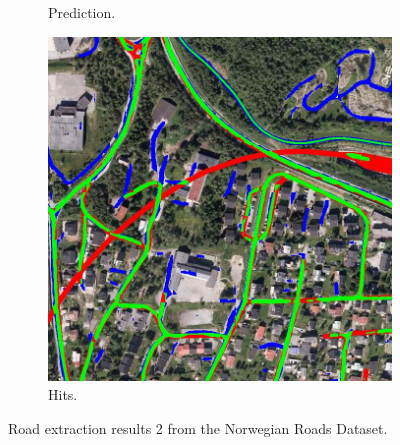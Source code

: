 \begin{figure}[H]
\begin{subfigure}{0.23\textwidth}
\caption{Prediction.}
\vspace{0.2cm} %
\end{subfigure}
\begin{subfigure}{0.23\textwidth}
\includegraphics[width=\textwidth]{figs/appendix/hit1217.jpg}
\caption{Hits.}
\vspace{0.2cm} %
\end{subfigure}
\caption{Road extraction results 2 from the Norwegian Roads Dataset.} \label{fig:Norway_app_results}
\end{figure}



